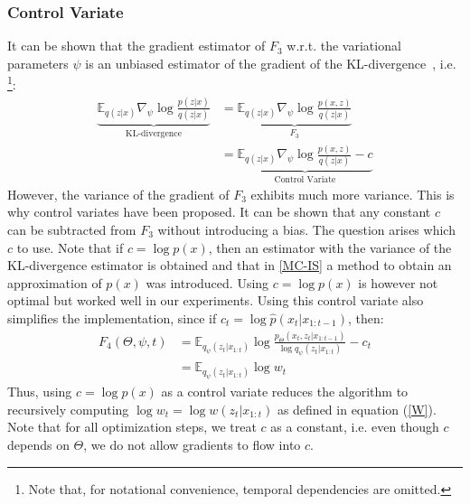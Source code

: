 \subsubsection{Control Variate}
It can be shown that the gradient estimator of $F_3$ w.r.t. the variational parameters $\psi$ is an unbiased estimator of the gradient of the KL-divergence~\cite{mnih2014neural}, i.e. \footnote{Note that, for notational convenience, temporal dependencies are omitted.}:
\begin{align*}
\underbrace{\mathbb E_{q(z | x)} \nabla_\psi  \log \frac{p(z|x)}{q(z|x)}}_{\text{KL-divergence}} &= \underbrace{\mathbb E_{q(z | x)} \nabla_\psi  \log \frac{p(x,z)}{q(z|x)}}_{F_3} \\
 &= \underbrace{\mathbb E_{q(z | x)} \nabla_\psi  \log \frac{p(x,z)}{q(z|x)} - c}_{\text{Control Variate}}
\end{align*} 
However, the variance of the gradient of $F_3$ exhibits much more variance. This is why control variates have been proposed. It can be shown that any constant $c$ can be subtracted from $F_3$ without introducing a bias. The question arises which $c$ to use. Note that if $c=\log p(x)$, then an estimator with the variance of the KL-divergence estimator is obtained and that in \ref{MC-IS} a method to obtain an approximation of $p(x)$ was introduced. Using $c=\log p(x)$ is however not optimal but worked well in our experiments. Using this control variate also simplifies the implementation, since if $c_t = \log \hat{p}(x_t | x_{1:t-1})$, then:
\begin{align*}
F_{4}(\Theta, \psi, t)&= \mathbb{E}_{q_\psi(z_t|x_{1:t})} \log \frac{p_\Theta(x_t,z_t|x_{1:t-1})}{ \log q_\psi(z_t|x_{1:t})} - c_t\\
&= \mathbb{E}_{q_\psi(z_t|x_{1:t})} \log w_t
\end{align*}
Thus, using $c=\log p(x)$ as a control variate reduces the algorithm to recursively computing $\log w_t = \log w(z_t|x_{1:t})$ as defined in equation (\ref{W}). Note that for all optimization steps, we treat $c$ as a constant, i.e. even though $c$ depends on $\Theta$, we do not allow gradients to flow into $c$.\\

